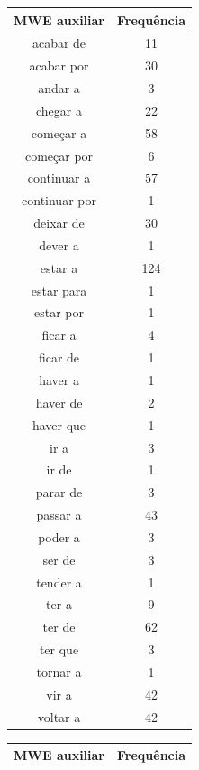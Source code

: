 \documentclass[output=paper,colorlinks,citecolor=brown]{langscibook}
\begin{document}
		\begin{table}[]
			\parbox{.45\linewidth}{
				\centering
				\begin{tabular}{|c|c|}
					\hline
					\textbf{MWE auxiliar} & \textbf{Frequência} \\\hline
						acabar de & 11\\\hline
						acabar por & 30\\\hline
						andar a & 3\\\hline
						chegar a & 22\\\hline
						começar a & 58\\\hline
						começar por & 6\\\hline
						continuar a & 57\\\hline
						continuar por & 1\\\hline
						deixar de & 30\\\hline
						dever a & 1\\\hline
						estar a & 124\\\hline
						estar para & 1\\\hline
						estar por & 1\\\hline
						ficar a & 4\\\hline
						ficar de & 1\\\hline
						haver a & 1\\\hline
						haver de & 2\\\hline
						haver que & 1\\\hline
						ir a & 3\\\hline
						ir de & 1\\\hline
						parar de & 3\\\hline
						passar a & 43\\\hline
						poder a & 3\\\hline
						ser de & 3\\\hline
						tender a & 1\\\hline
						ter a & 9\\\hline
						ter de & 62\\\hline
						ter que & 3\\\hline
						tornar a & 1\\\hline
						vir a & 42\\\hline
						voltar a & 42\\\hline
				\end{tabular}
			}
			\hfill
			\parbox{.45\linewidth}{
				\centering
				\begin{tabular}{|c|c|}
					\hline
					\textbf{MWE auxiliar} & \textbf{Frequência} \\\hline

\end{tabular}}
\end{table}
\end{document}
